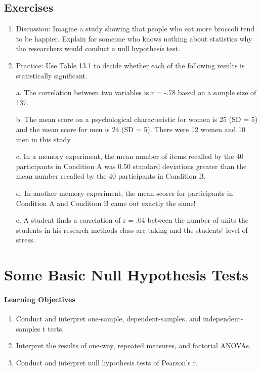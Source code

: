 \subsection{Exercises}
\begin{fullwidth}
\begin{enumerate}
\item Discussion: Imagine a study showing that people who eat more broccoli tend to be happier. Explain for someone who knows nothing about statistics why the researchers would conduct a null hypothesis test.

\item Practice: Use Table 13.1 to decide whether each of the following results is statistically significant.

a. The correlation between two variables is r = -.78 based on a sample size of 137.

b. The mean score on a psychological characteristic for women is 25 (SD = 5) and the mean score for men is 24 (SD = 5). There were 12 women and 10 men in this study.

c. In a memory experiment, the mean number of items recalled by the 40 participants in Condition A was 0.50 standard deviations greater than the mean number recalled by the 40 participants in Condition B.

d. In another memory experiment, the mean scores for participants in Condition A and Condition B came out exactly the same!

e. A student finds a correlation of r = .04 between the number of units the students in his research methods class are taking and the students' level of stress.

\end{enumerate}
\end{fullwidth}

\section{Some Basic Null Hypothesis Tests}



\paragraph{Learning Objectives}
    \begin{enumerate}
    \item   Conduct and interpret one-sample, dependent-samples, and independent-samples t tests.
    \item Interpret the results of one-way, repeated measures, and factorial ANOVAs.

    \item Conduct and interpret null hypothesis tests of Pearson's r.
      \end{enumerate}




